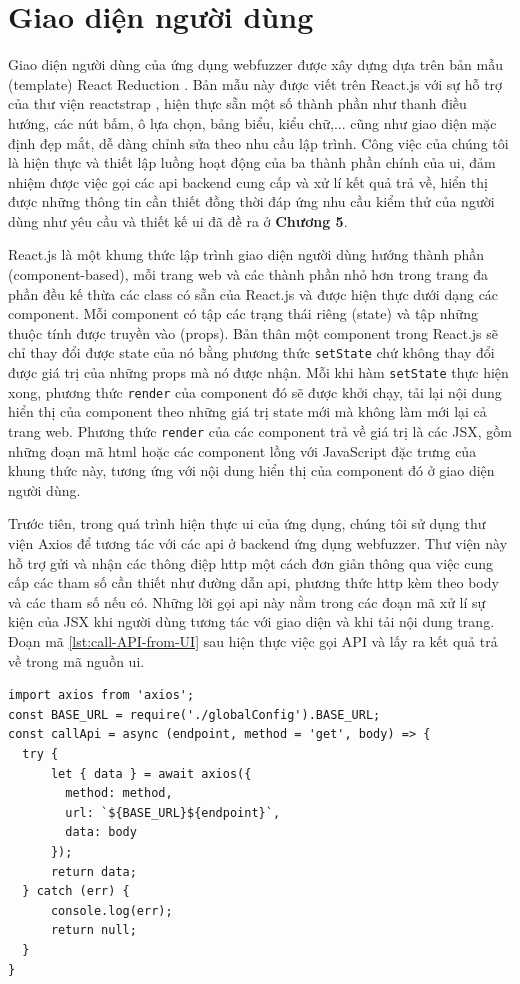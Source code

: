 \section{Giao diện người dùng}
Giao diện người dùng của ứng dụng webfuzzer được xây dựng dựa trên bản mẫu (template) React Reduction \parencite{react-reduction-github}. Bản mẫu này được viết trên React.js với sự hỗ trợ của thư viện reactstrap \parencite{reactstrap}, hiện thực sẵn một số thành phần như thanh điều hướng, các nút bấm, ô lựa chọn, bảng biểu, kiểu chữ,... cũng như giao diện mặc định đẹp mắt, dễ dàng chỉnh sửa theo nhu cầu lập trình. Công việc của chúng tôi là hiện thực và thiết lập luồng hoạt động của ba thành phần chính của \acrshort{ui}, đảm nhiệm được việc gọi các \acrshort{api} backend cung cấp và xử lí kết quả trả về, hiển thị được những thông tin cần thiết đồng thời đáp ứng nhu cầu kiểm thử của người dùng như yêu cầu và thiết kế \acrshort{ui} đã đề ra ở \textbf{Chương 5}.\par
React.js là một khung thức lập trình giao diện người dùng hướng thành phần (component-based), mỗi trang web và các thành phần nhỏ hơn trong trang đa phần đều kế thừa các class có sẵn của React.js và được hiện thực dưới dạng các component. Mỗi component có tập các trạng thái riêng (state) và tập những thuộc tính được truyền vào (props). Bản thân một component trong React.js sẽ chỉ thay đổi được state của nó bằng phương thức \texttt{setState} chứ không thay đổi được giá trị của những props mà nó được nhận. Mỗi khi hàm \texttt{setState} thực hiện xong, phương thức \texttt{render} của component đó sẽ được khởi chạy, tải lại nội dung hiển thị của component theo những giá trị state mới mà không làm mới lại cả trang web. Phương thức \texttt{render} của các component trả về giá trị là các JSX, gồm những đoạn mã \acrshort{html} hoặc các component lồng với JavaScript đặc trưng của khung thức này, tương ứng với nội dung hiển thị của component đó ở giao diện người dùng.\par
Trước tiên, trong quá trình hiện thực \acrshort{ui} của ứng dụng, chúng tôi sử dụng thư viện Axios
để tương tác với các \acrshort{api} ở backend ứng dụng webfuzzer. Thư viện này hỗ trợ gửi và nhận các thông điệp \acrshort{http} một cách đơn giản thông qua việc cung cấp các tham số cần thiết như đường dẫn \acrshort{api}, phương thức \acrshort{http} kèm theo body và các tham số nếu có. Những lời gọi \acrshort{api} này nằm trong các đoạn mã xử lí sự kiện của JSX khi người dùng tương tác với giao diện và khi tải nội dung trang. Đoạn mã \ref{lst:call-API-from-UI} sau hiện thực việc gọi API và lấy ra kết quả trả về trong mã nguồn \acrshort{ui}.
\begin{lstlisting}[style=ES6, label={lst:call-API-from-UI}, caption={Gọi API từ mã nguồn UI}]
import axios from 'axios';
const BASE_URL = require('./globalConfig').BASE_URL;
const callApi = async (endpoint, method = 'get', body) => {
  try {
      let { data } = await axios({
        method: method,
        url: `${BASE_URL}${endpoint}`,
        data: body
      });
      return data;
  } catch (err) {
      console.log(err);
      return null;
  }
}
\end{lstlisting}

